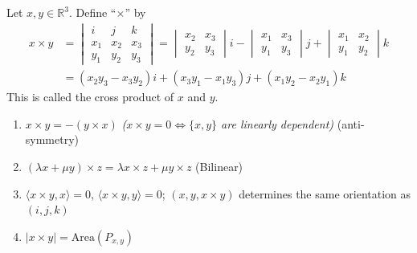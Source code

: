 \begin{definition}
    Let $x,y\in\mathbb{R}^3$. Define ``$\times$'' by
    \begin{align*}
        x\times y & =
        \begin{vmatrix}
            i   & j   & k   \\
            x_1 & x_2 & x_3 \\
            y_1 & y_2 & y_3
        \end{vmatrix}=
        \begin{vmatrix}
            x_2 & x_3 \\
            y_2 & y_3
        \end{vmatrix}i-
        \begin{vmatrix}
            x_1 & x_3 \\
            y_1 & y_3
        \end{vmatrix}j+
        \begin{vmatrix}
            x_1 & x_2 \\
            y_1 & y_2
        \end{vmatrix}k                                                  \\
                  & =(x_2y_3-x_3y_2)i+(x_3y_1-x_1y_3)j+(x_1y_2-x_2y_1)k
    \end{align*}
    This is called the cross product of $x$ and $y$.
\end{definition}

\begin{proposition}
    \begin{enumerate}
        \item $x\times y=-(y\times x)$ \emph{($x\times y=0\iff\{x,y\}$ are linearly dependent)} (anti-symmetry)
        \item $(\lambda x+\mu y)\times z=\lambda x\times z+\mu y\times z$ (Bilinear)
        \item $\langle x\times y,x\rangle=0$, $\langle x\times y,y\rangle=0$; $(x,y,x\times y)$ determines the same orientation as $(i,j,k)$
        \item $|x\times y|=\text{Area}\left(P_{x,y}\right)$
    \end{enumerate}
\end{proposition}

